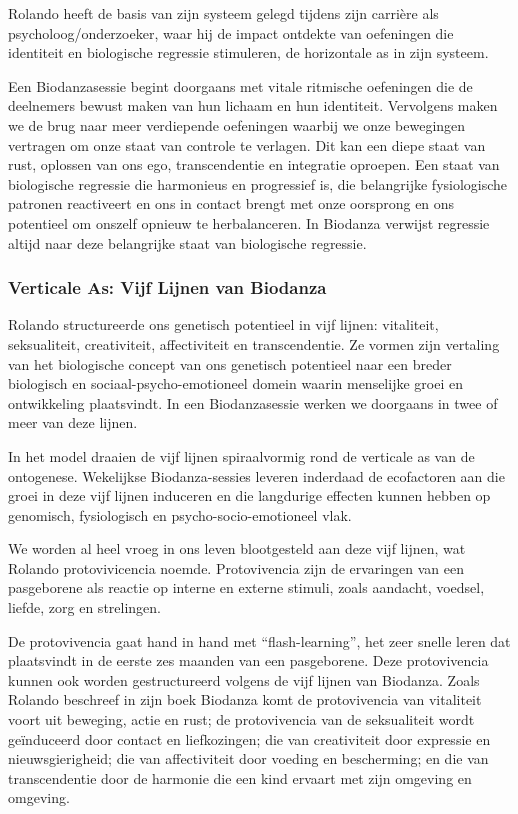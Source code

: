 \documentclass[
  11pt,
]{book}
\begin{document}
Rolando heeft de basis van zijn systeem gelegd tijdens zijn carrière als psycholoog/onderzoeker, waar hij de impact ontdekte van oefeningen die identiteit en biologische regressie stimuleren, de horizontale as in zijn systeem.

Een Biodanzasessie begint doorgaans met vitale ritmische oefeningen die de deelnemers bewust maken van hun lichaam en hun identiteit. Vervolgens maken we de brug naar meer verdiepende oefeningen waarbij we onze bewegingen vertragen om onze staat van controle te verlagen. Dit kan een diepe staat van rust, oplossen van ons ego, transcendentie en integratie oproepen. Een staat van biologische regressie die harmonieus en progressief is, die belangrijke fysiologische patronen reactiveert en ons in contact brengt met onze oorsprong en ons potentieel om onszelf opnieuw te herbalanceren. In Biodanza verwijst regressie altijd naar deze belangrijke staat van biologische regressie.

\hypertarget{verticale-as-vijf-lijnen-van-biodanza}{%
\subsubsection{Verticale As: Vijf Lijnen van Biodanza}\label{verticale-as-vijf-lijnen-van-biodanza}}

Rolando structureerde ons genetisch potentieel in vijf lijnen: vitaliteit, seksualiteit, creativiteit, affectiviteit en transcendentie. Ze vormen zijn vertaling van het biologische concept van ons genetisch potentieel naar een breder biologisch en sociaal-psycho-emotioneel domein waarin menselijke groei en ontwikkeling plaatsvindt. In een Biodanzasessie werken we doorgaans in twee of meer van deze lijnen.

In het model draaien de vijf lijnen spiraalvormig rond de verticale as van de ontogenese. Wekelijkse Biodanza-sessies leveren inderdaad de ecofactoren aan die groei in deze vijf lijnen induceren en die langdurige effecten kunnen hebben op genomisch, fysiologisch en psycho-socio-emotioneel vlak.

We worden al heel vroeg in ons leven blootgesteld aan deze vijf lijnen, wat Rolando protovivicencia noemde. Protovivencia zijn de ervaringen van een pasgeborene als reactie op interne en externe stimuli, zoals aandacht, voedsel, liefde, zorg en strelingen.

De protovivencia gaat hand in hand met ``flash-learning'', het zeer snelle leren dat plaatsvindt in de eerste zes maanden van een pasgeborene. Deze protovivencia kunnen ook worden gestructureerd volgens de vijf lijnen van Biodanza. Zoals Rolando beschreef in zijn boek Biodanza \citep{toro2008} komt de protovivencia van vitaliteit voort uit beweging, actie en rust; de protovivencia van de seksualiteit wordt geïnduceerd door contact en liefkozingen; die van creativiteit door expressie en nieuwsgierigheid; die van affectiviteit door voeding en bescherming; en die van transcendentie door de harmonie die een kind ervaart met zijn omgeving en omgeving.
\end{document}
